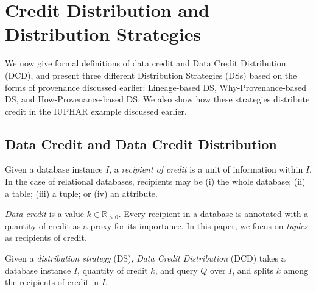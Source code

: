 \section{Credit Distribution and Distribution Strategies}
\label{section:distribution_strategies}
We now give formal definitions of data credit and Data Credit Distribution (DCD), and present three different Distribution Strategies (DSs) based on the forms of provenance discussed earlier:  Lineage-based DS, Why-Provenance-based DS, and How-Provenance-based DS.  We also show how these strategies distribute credit in the IUPHAR example discussed earlier.


\subsection{Data Credit and Data Credit Distribution}
Given a database instance $I$, a \emph{recipient of credit} is a unit of information within $I$. In the case of relational databases, recipients may be (i) the whole database; (ii) a table; (iii) a tuple; or (iv) an attribute.

\emph{Data credit} is a value $k \in \mathbb{R}_{>0}$. 
Every recipient in a database is annotated with a quantity of credit as a proxy for its importance. In this paper, we focus on {\em tuples} as recipients of credit. 


Given a \emph{distribution strategy} (DS),  \emph{Data Credit Distribution} (DCD) takes a database instance $I$, quantity of credit $k$, %
and query $Q$ over $I$, and splits $k$ among the recipients of credit in $I$.



